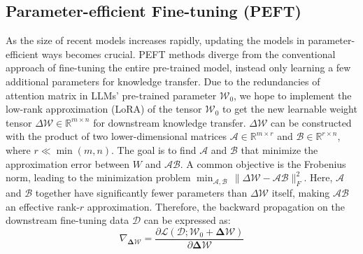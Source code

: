 \subsection{Parameter-efficient Fine-tuning (PEFT)}
\label{sec:peft}
As the size of recent models increases rapidly, updating the models in parameter-efficient ways becomes crucial.
PEFT \cite{ding2023parameter,wang2023parameter,zhai2023parameter,yu2024visual,wang2024lion} methods diverge from the conventional approach of fine-tuning the entire pre-trained model, instead only learning a few additional parameters for knowledge transfer.
Due to the redundancies of attention matrix in LLMs' pre-trained parameter $\mathcal{W}_0$, we hope to implement the low-rank approximation (LoRA) of the tensor $\mathcal{W}_0$ to get the new learnable weight tensor $\Delta \mathcal{W} \in \mathbb{R}^{m \times n}$ for downstream knowledge transfer. $\Delta \mathcal{W}$ can be constructed with the product of two lower-dimensional matrices $\mathcal{A} \in \mathbb{R}^{m \times r}$ and $\mathcal{B} \in \mathbb{R}^{r \times n}$, where $r \ll \min(m, n)$. The goal is to find $\mathcal{A}$ and $\mathcal{B}$ that minimize the approximation error between $W$ and $\mathcal{A}\mathcal{B}$. A common objective is the Frobenius norm, leading to the minimization problem
$\min_{\mathcal{A}, \mathcal{B}} \, \| \Delta \mathcal{W} - \mathcal{A} \mathcal{B} \|_F^2$.
Here, $\mathcal{A}$ and $\mathcal{B}$ together have significantly fewer parameters than $\Delta \mathcal{W}$ itself, making $\mathcal{A}\mathcal{B}$ an effective rank-$r$ approximation. Therefore, the backward propagation on the downstream fine-tuning data $\mathcal{D}$ can be expressed as:
\begin{equation}
\nabla_{\boldsymbol{\Delta{\mathcal{W}}}} = \frac{\partial \mathcal{L}\left( \mathcal{D};\boldsymbol{\mathcal{W}}_0 + \boldsymbol{\Delta{\mathcal{W}}} \right)}{\partial \boldsymbol{\Delta{\mathcal{W}}}}
\end{equation}

